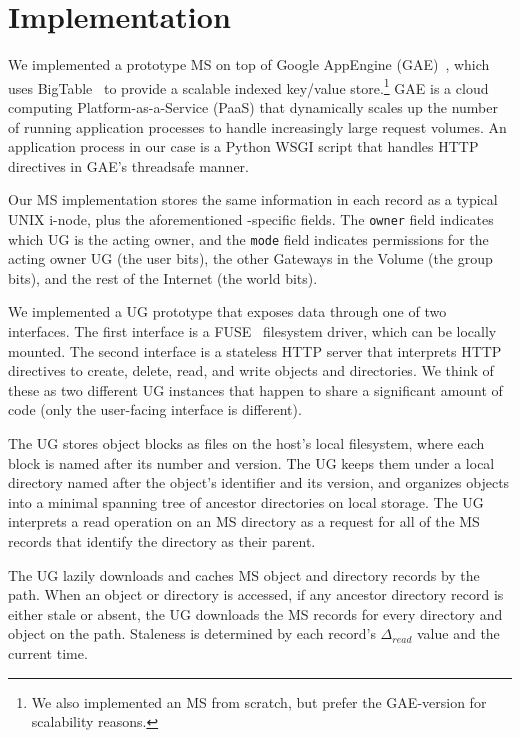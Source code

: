 \section{Implementation}
\label{sec:implementation}

We implemented a prototype MS on top of Google AppEngine (GAE)~\cite{google-appengine}, which uses BigTable~\cite{bigtable} to provide a scalable indexed key/value store.\footnote{We also implemented an MS from scratch, but prefer the GAE-version for scalability reasons.} GAE is a cloud computing Platform-as-a-Service (PaaS) that dynamically scales up the number of running application processes to handle increasingly large request volumes. An application process in our case is a Python WSGI script that handles HTTP directives in GAE's threadsafe manner.

Our MS implementation stores the same information in each record as a typical UNIX i-node, plus the aforementioned \Syndicate-specific fields. The \texttt{owner} field indicates which UG is the acting owner, and the \texttt{mode} field indicates permissions for the acting owner UG (the user bits), the other Gateways in the Volume (the group bits), and the rest of the Internet (the world bits).

We implemented a UG prototype that exposes data through one of two interfaces. The first interface is a FUSE~\cite{FUSE} filesystem driver, which can be locally mounted. The second interface is a stateless HTTP server that interprets HTTP directives to create, delete, read, and write objects and directories. We think of these as two different UG instances that happen to share a significant amount of code (only the user-facing interface is different).

The UG stores object blocks as files on the host's local filesystem, where each block is named after its number and version. The UG keeps them under a local directory named after the object's identifier and its version, and organizes objects into a minimal spanning tree of ancestor directories on local storage. The UG interprets a read operation on an MS directory as a request for all of the MS records that identify the directory as their parent.

The UG lazily downloads and caches MS object and directory records by the path. When an object or directory is accessed, if any ancestor directory record is either stale or absent, the UG downloads the MS records for every directory and object on the path. Staleness is determined by each record's $\Delta_{read}$ value and the current time.

